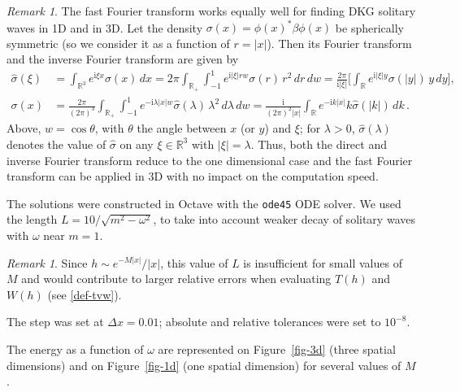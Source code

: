 \documentclass[12pt]{extarticle}
\newcommand{\jj}{\mathrm{i}}
\def\R{\mathbb{R}}
\newcommand{\abs}[1]{\vert #1 \vert}
\theoremstyle{plain}
\theoremstyle{remark}
\newtheorem{remark}[lemma]{Remark}
\begin{document}
\begin{remark}
\label{remark-3d}
The fast Fourier transform
works equally well
for finding DKG
solitary waves
in 1D and in 3D.
Let the density
$\sigma(x)=\phi(x)^*\beta\phi(x)$
be spherically symmetric
(so we consider it as a function of $r=\abs{x}$).
Then its Fourier transform
and the inverse Fourier
transform
are given by
\begin{align*}
\hat\sigma(\xi)
&=
\int_{\R^3}
e^{\jj\xi x}\sigma(x)\,dx
=2\pi\int_{\R_{+}}
\int_{-1}^1
e^{\jj\abs{\xi} r w}
\sigma(r)\,r^2\,dr\,dw
=
\frac{2\pi}{\jj\abs{\xi}}
\Big[
\int_{\R}
e^{\jj\abs{\xi} y}
\sigma(\abs{y})\,y\,dy
\Big],
\\
\sigma(x)
&=
\frac{2\pi}{(2\pi)^3}
\int_{\R_{+}}
\int_{-1}^1
e^{-\jj\lambda \abs{x} w}
\hat\sigma(\lambda)
\,\lambda^2\,d\lambda
\,dw
=\frac{\jj}{(2\pi)^2\abs{x}}
\int_{\R}
e^{-\jj k\abs{x}}
k\hat\sigma(\abs{k})
\,dk\,.
\end{align*}
Above,
$w=\cos\theta$,
with $\theta$ the angle between
$x$ (or $y$) and $\xi$;
for $\lambda>0$,
$\hat\sigma(\lambda)$
denotes
the value of $\hat\sigma$
on any $\xi\in\R^3$ with $\abs{\xi}=\lambda$.
Thus, both the direct and inverse
Fourier transform reduce to the
one dimensional case
and the fast Fourier transform
can be applied
in 3D
with no impact on the
computation speed.
\end{remark}

The solutions were constructed in
Octave with the {\tt ode45} ODE solver.
We used the length
$L=10/\sqrt{m^2-\omega^2}$,
to take into account weaker decay of solitary waves
with $\omega$ near $m=1$.

\begin{remark}
Since $h\sim e^{-M\abs{x}}/\abs{x}$,
this value of $L$ is
insufficient for small
values of $M$
and would contribute
to larger
relative errors when evaluating
$T(h)$ and $W(h)$
(see \eqref{def-tvw}).
\end{remark}

The step was set at $\varDelta x=0.01$;
absolute and relative tolerances were set to $10^{-8}$.

The energy
as a function of $\omega$
are represented
on Figure~\ref{fig-3d}
(three spatial dimensions)
and on Figure~\ref{fig-1d}
(one spatial dimension)
for several values of $M$.  
\end{document}
